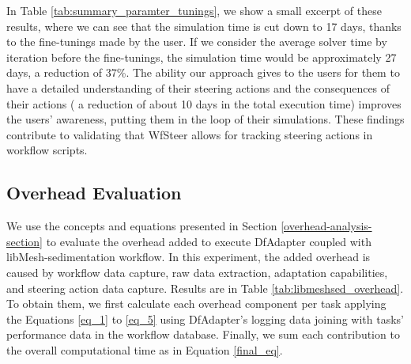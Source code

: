  In Table \ref{tab:summary_paramter_tunings}, we show a small excerpt of these
results, where we can see that the simulation time is cut down to 17
days, thanks to the fine-tunings made by the user.
If we consider the average solver time by iteration before the fine-tunings, the simulation time would be
approximately 27 days, \ie{} a reduction of 37\%. The ability our approach
gives to the users for them to have a detailed understanding of their steering
actions and the consequences of their actions (\eg{} a reduction of about 10 days
in the total execution time) improves the users' awareness, putting them in the loop
of their simulations.
These findings contribute to validating that WfSteer allows for tracking steering actions in workflow scripts.



















\subsection{Overhead Evaluation}
\label{sec_overhead_eval_wokflow_script}

We use the concepts and equations presented in Section \ref{overhead-analysis-section} to evaluate
the overhead added to execute DfAdapter coupled with
libMesh-sedimentation workflow.
In this experiment, the added overhead is caused by
workflow data capture, raw data extraction, adaptation capabilities, and steering action data capture.
Results are in Table \ref{tab:libmeshsed_overhead}.
To obtain them, we first calculate each overhead component per task applying the Equations \ref{eq_1} to \ref{eq_5} using DfAdapter’s logging data joining with tasks’ performance data in the workflow database.
 Finally, we sum each contribution to the overall computational time as in
Equation \ref{final_eq}.



